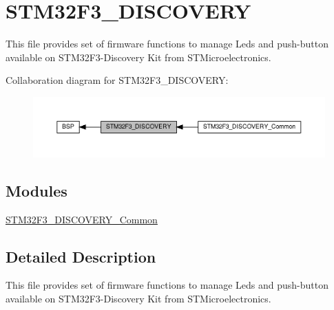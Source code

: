 \hypertarget{group__STM32F3__DISCOVERY}{}\section{S\+T\+M32\+F3\+\_\+\+D\+I\+S\+C\+O\+V\+E\+RY}
\label{group__STM32F3__DISCOVERY}


This file provides set of firmware functions to manage Leds and push-\/button available on S\+T\+M32\+F3-\/\+Discovery Kit from S\+T\+Microelectronics.  


Collaboration diagram for S\+T\+M32\+F3\+\_\+\+D\+I\+S\+C\+O\+V\+E\+RY\+:\nopagebreak
\begin{figure}[H]
\begin{center}
\leavevmode
\includegraphics[width=350pt]{group__STM32F3__DISCOVERY}
\end{center}
\end{figure}
\subsection*{Modules}
\begin{DoxyCompactItemize}
\item 
\hyperlink{group__STM32F3__DISCOVERY__Common}{S\+T\+M32\+F3\+\_\+\+D\+I\+S\+C\+O\+V\+E\+R\+Y\+\_\+\+Common}
\end{DoxyCompactItemize}


\subsection{Detailed Description}
This file provides set of firmware functions to manage Leds and push-\/button available on S\+T\+M32\+F3-\/\+Discovery Kit from S\+T\+Microelectronics. 

